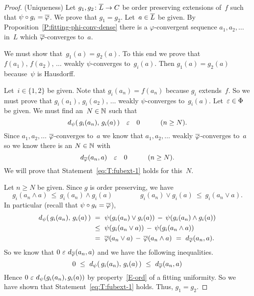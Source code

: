 \documentclass[main.tex]{subfiles}
\begin{document}
\begin{proof}
(Uniqueness)
Let $g_1,g_2\colon \overline L \rightarrow C$
be order preserving extensions of~$f$ such that
$\psi\circ g_i = \overline\varphi$.
We prove that $g_1 = g_2$.
Let~$a\in \overline L$ be given.
By Proposition~\ref{P:fitting-phi-conv-dense}
there is a $\varphi$-convergent sequence $a_1,a_2,\dotsc$
in~$L$ which $\overline\varphi$-converges to~$a$.

We must show that~$g_1(a) = g_2(a)$.
To this end we prove that $f(a_1),\,f(a_2),\,\dotsc$
weakly $\psi$-converges to~$g_i(a)$.
Then  $g_1(a) = g_2(a)$
because~$\psi$ is Hausdorff.

Let~$i\in\{1,2\}$ be given.
Note that $g_i(a_n) = f(a_n)$ because $g_i$ extends~$f$.
So we must prove that $g_i(a_1),\,g_i(a_2),\,\dotsc$
weakly $\psi$-converges to~$g_i(a)$.
Let~$\varepsilon\in\Phi$ be given.
We must find 
an~$N\in \mathbb{N}$
such that
\begin{equation}
\label{eq:T:fubext-1}
d_{\smash{\psi}}(\,g_i(a_n),\,g_i(a)\,) \quad\varepsilon\quad 0
\qquad\quad(n\geq N).
\end{equation}
Since $a_1,a_2,\dotsc$ $\overline\varphi$-converges to~$a$
we know that $a_1,a_2,\dotsc$ weakly $\overline\varphi$-converges to~$a$
so we know there is an $N\in \mathbb{N}$ with
\begin{equation*}
d_{\smash{\overline\varphi}}(a_n,a) \quad\varepsilon\quad 0\qquad\quad(n\geq N).
\end{equation*}
We will prove that Statement~\eqref{eq:T:fubext-1}
holds for this~$N$.

Let $n\geq N$ be given.
Since $g$ is order preserving, we have
\begin{equation*}
g_i(a_n \wedge a) \ \leq\ g_i(a_n)\wedge g_i(a)
\qquad\qquad
g_i(a_n) \vee g_i(a) \ \leq\  g_i (a_n \vee a).
\end{equation*}
In particular
(recall that $\psi\circ g_i=\overline\varphi$),
\begin{equation}
\label{eq:T-fubext-3}
\begin{alignedat}{3}
\ld\psi(\,g_i(a_n),\,g_i(a)\,) 
\ &=\ 
\psi(g_i(a_n) \vee g_i(a)) \,-\, \psi(g_i(a_n)\wedge g_i(a)) \\
\ &\leq\ 
\psi(g_i(a_n\vee a)) \,-\, \psi(g_i(a_n \wedge a)) \\
\ &=\ 
\ol\varphi(a_n \vee a) \,-\, \ol\varphi(a_n\wedge a) 
\ =\ \ld{\ol\varphi}(a_n,a).
\end{alignedat}
\end{equation}
So we
know that $0\ \ve\ \ld{\ol\varphi}(a_n,a)$
and we have the following inequalities.
\begin{equation*}
0 \ \leq\ \ld{\psi}(\,g_i(a_n),\,g_i(a)\,) \ \leq\ \ld{\ol\varphi}(a_n,a)
\end{equation*}
Hence $0 \ \ve\ \ld{\psi}(g_i(a_n),g_i(a))$
by property~\ref{E-ord} of a fitting uniformity.
So we have shown that Statement~\eqref{eq:T:fubext-1} holds.
Thus, $g_1=g_2$.


\end{proof}
\end{document}
